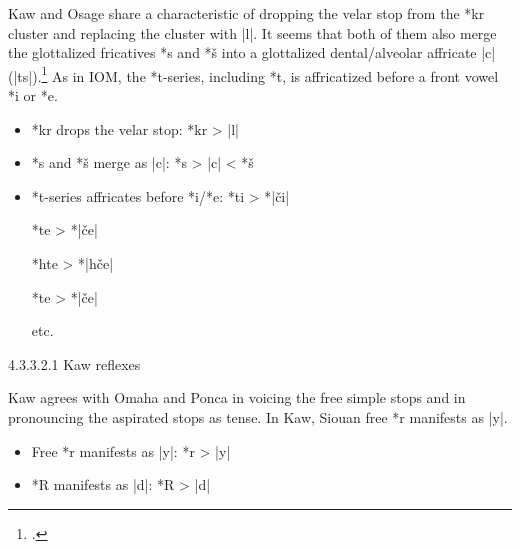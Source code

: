 \documentclass[output=paper]{LSP/langsci}
\begin{document}

Kaw and Osage share a characteristic of dropping the velar stop from the *kr cluster and replacing the cluster with |l|.  It seems that both of them also merge the glottalized fricatives *s\textsuperscript{} and *š\textsuperscript{} into a glottalized dental/alveolar affricate |c\textsuperscript{}| (|ts\textsuperscript{}|).\footnote{\citealt[856]{Rankinetal2006PDF}.} As in IOM, the *t-series, including *t\textsuperscript{}, is affricatized before a front vowel *i or *e.  

\begin{itemize}
\item *kr drops the velar stop: \hspace{3em} *kr	>	|l|
\item *s\textsuperscript{} and *š\textsuperscript{} merge as |c\textsuperscript{}|: \hspace{3em} *s\textsuperscript{}	>	|c\textsuperscript{}|	<	*š\textsuperscript{}

\item *t-series affricates before *i/*e: \hspace{1em} *ti	>	*|\v{c}i|

\hspace{14em} *te	>	*|\v{c}e|

\hspace{14em} *hte	>	*|h\v{c}e|

\hspace{14em} *t\textsuperscript{}e	>	*|\v{c}\textsuperscript{}e|

\hspace{14em} etc.
\end{itemize}

4.3.3.2.1  Kaw reflexes
\vspace{1em}

Kaw agrees with Omaha and Ponca in voicing the free simple stops and in pronouncing the aspirated stops as tense.  In Kaw, Siouan free *r manifests as |y|.

\begin{itemize}
\item Free *r manifests as |y|: \hspace{1em} *r	>	|y|
\item *R manifests as |d|: \hspace{3em} *R	>	|d|
\end{itemize}
\end{document}
